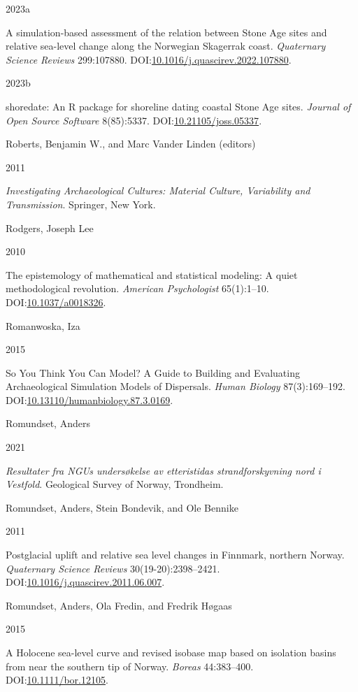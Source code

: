 \documentclass[
  12pt,
  a4paper,
  oneside]{book}
\newlength{\cslhangindent}
\newlength{\csllabelwidth}
\newlength{\cslentryspacingunit} %
\newenvironment{CSLReferences}[2] %
 {%
  \setlength{\parindent}{0pt}
  \ifodd #1
  \let\oldpar\par
  \def\par{\hangindent=\cslhangindent\oldpar}
  \fi
  \setlength{\parskip}{#2\cslentryspacingunit}
 }%
 {}
\newcommand{\CSLBlock}[1]{#1\hfill\break}
\newcommand{\CSLLeftMargin}[1]{\parbox[t]{\csllabelwidth}{#1}}
\newcommand{\CSLRightInline}[1]{\parbox[t]{\linewidth - \csllabelwidth}{#1}\break}
\begin{document}
\begin{CSLReferences}{0}{0}
\leavevmode{}%
\CSLLeftMargin{ 2023a }
\CSLRightInline{{A simulation-based assessment of the relation between Stone Age sites and relative sea-level change along the Norwegian Skagerrak coast}. \emph{Quaternary Science Reviews} 299:107880. DOI:\href{https://doi.org/10.1016/j.quascirev.2022.107880}{10.1016/j.quascirev.2022.107880}.}

\leavevmode{}%
\CSLLeftMargin{ 2023b }
\CSLRightInline{{shoredate: An R package for shoreline dating coastal Stone Age sites}. \emph{Journal of Open Source Software} 8(85):5337. DOI:\href{https://doi.org/10.21105/joss.05337}{10.21105/joss.05337}.}

\leavevmode{}%
\CSLBlock{Roberts, Benjamin W., and Marc Vander Linden (editors)}
\CSLLeftMargin{ 2011}
\CSLRightInline{\emph{{Investigating Archaeological Cultures: Material Culture, Variability and Transmission}}. Springer, New York.}

\leavevmode{}%
\CSLBlock{Rodgers, Joseph Lee}
\CSLLeftMargin{ 2010}
\CSLRightInline{{The epistemology of mathematical and statistical modeling: A quiet methodological revolution}. \emph{American Psychologist} 65(1):1--10. DOI:\href{https://doi.org/10.1037/a0018326}{10.1037/a0018326}.}

\leavevmode{}%
\CSLBlock{Romanwoska, Iza}
\CSLLeftMargin{ 2015}
\CSLRightInline{So You Think You Can Model? A Guide to Building and Evaluating Archaeological Simulation Models of Dispersals. \emph{Human Biology} 87(3):169--192. DOI:\href{https://doi.org/10.13110/humanbiology.87.3.0169}{10.13110/humanbiology.87.3.0169}.}

\leavevmode{}%
\CSLBlock{Romundset, Anders}
\CSLLeftMargin{ 2021}
\CSLRightInline{\emph{{Resultater fra NGUs undersøkelse av etteristidas strandforskyvning nord i Vestfold}}. Geological Survey of Norway, Trondheim.}

\leavevmode{}%
\CSLBlock{Romundset, Anders, Stein Bondevik, and Ole Bennike}
\CSLLeftMargin{ 2011}
\CSLRightInline{Postglacial uplift and relative sea level changes in Finnmark, northern Norway. \emph{Quaternary Science Reviews} 30(19-20):2398--2421. DOI:\href{https://doi.org/10.1016/j.quascirev.2011.06.007}{10.1016/j.quascirev.2011.06.007}.}

\leavevmode{}%
\CSLBlock{Romundset, Anders, Ola Fredin, and Fredrik Høgaas}
\CSLLeftMargin{ 2015}
\CSLRightInline{A Holocene sea{-}level curve and revised isobase map based on isolation basins from near the southern tip of Norway. \emph{Boreas} 44:383--400. DOI:\href{https://doi.org/10.1111/bor.12105}{10.1111/bor.12105}.}


\end{CSLReferences}
\end{document}
